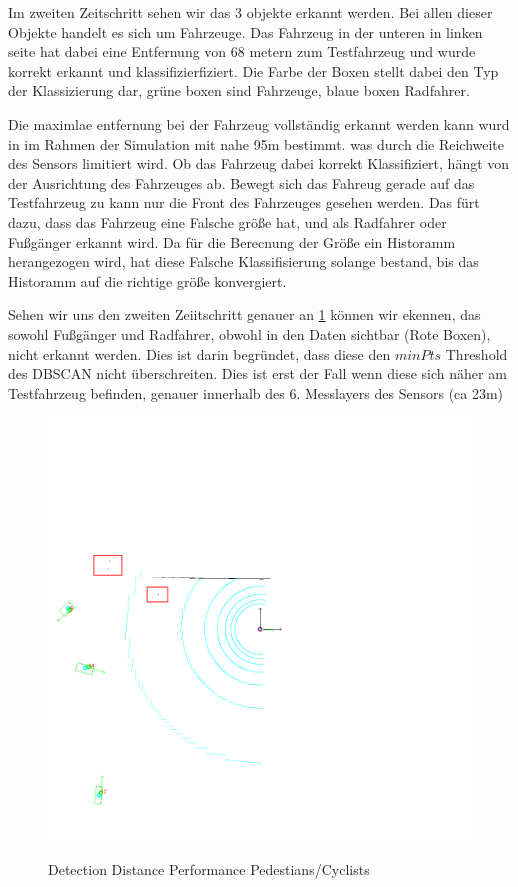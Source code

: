\documentclass[11pt,oneside,openright]{mpreport}
\begin{document}
Im zweiten Zeitschritt sehen wir das 3 objekte erkannt werden. Bei allen dieser Objekte handelt es sich um Fahrzeuge. Das Fahrzeug in der unteren in linken seite hat dabei eine Entfernung von 68 metern zum Testfahrzeug und wurde korrekt erkannt und klassifizierfiziert.
Die Farbe der Boxen stellt dabei den Typ der Klassizierung dar, grüne boxen sind Fahrzeuge, blaue boxen Radfahrer.

Die maximlae entfernung bei der Fahrzeug vollständig erkannt werden kann wurd in im Rahmen der Simulation mit nahe 95m bestimmt. was durch die Reichweite des Sensors limitiert
wird. Ob das Fahrzeug dabei korrekt Klassifiziert, hängt von der Ausrichtung des Fahrzeuges ab. Bewegt sich das Fahreug gerade auf das Testfahrzeug zu kann nur die Front des Fahrzeuges gesehen werden.
Das fürt dazu, dass das Fahrzeug eine Falsche größe hat, und als Radfahrer oder Fußgänger erkannt wird. Da für die Berecnung der Größe ein Historamm herangezogen wird, hat diese Falsche Klassifisierung
solange bestand, bis das Historamm auf die richtige größe konvergiert.

Sehen wir uns den zweiten Zeiitschritt genauer an \cref{detection_performance2} können wir ekennen, das sowohl Fußgänger und Radfahrer, obwohl in den Daten sichtbar (Rote Boxen), nicht erkannt werden.
Dies ist darin begründet, dass diese den $minPts$ Threshold des \ac{DBSCAN} nicht überschreiten. Dies ist erst der Fall wenn diese sich näher am Testfahrzeug befinden, genauer innerhalb des 6. Messlayers des Sensors (ca 23m)

\begin{figure}[!htb]
  \caption{Detection Distance Performance Pedestians/Cyclists} 
  \centering
  \includegraphics[width=\textwidth]{bilder/alg/img100002_m.png}
 \label{detection_performance2}
\end{figure}
\end{document}
